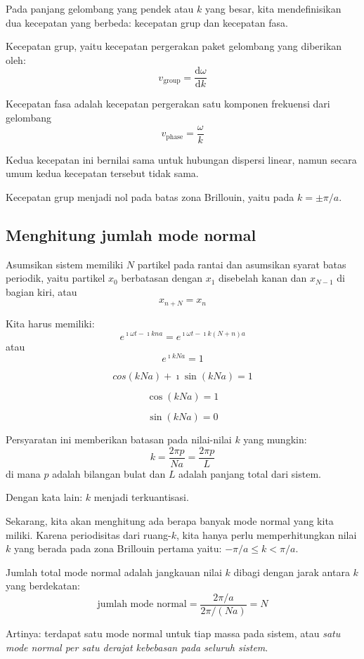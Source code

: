 Pada panjang gelombang yang pendek atau \(k\) yang besar, kita
mendefinisikan dua kecepatan yang berbeda: kecepatan grup dan kecepatan
fasa.

Kecepatan grup, yaitu kecepatan pergerakan paket gelombang yang
diberikan oleh: \[
v_{\mathrm{group}} = \frac{\mathrm{d}\omega}{\mathrm{d}k}
\]

Kecepatan fasa adalah kecepatan pergerakan satu komponen frekuensi dari
gelombang \[
v_{\mathrm{phase}} = \frac{\omega}{k}
\]

Kedua kecepatan ini bernilai sama untuk hubungan dispersi linear, namun
secara umum kedua kecepatan tersebut tidak sama.

Kecepatan grup menjadi nol pada batas zona Brillouin, yaitu pada
\(k = \pm \pi/a\).

\subsection{Menghitung jumlah mode normal}

Asumsikan sistem memiliki \(N\) partikel pada rantai dan asumsikan
syarat batas periodik, yaitu partikel \(x_{0}\) berbatasan dengan
\(x_{1}\) disebelah kanan dan \(x_{N-1}\) di bagian kiri, atau \[
x_{n+N} = x_{n}
\]

Kita harus memiliki: \[
e^{\imath \omega t - \imath k n a} =
e^{\imath \omega t - \imath k (N+n) a}
\] atau \[
e^{\imath k N a} = 1
\]

\[
cos(kNa) + \imath \sin(kNa) = 1
\]

\[
\cos(kNa) = 1
\]

\[
\sin(kNa) = 0
\]

Persyaratan ini memberikan batasan pada nilai-nilai \(k\) yang mungkin:
\[
k = \frac{2\pi p}{Na} = \frac{2\pi p}{L}
\] di mana \(p\) adalah bilangan bulat dan \(L\) adalah panjang total
dari sistem.

Dengan kata lain: \(k\) menjadi terkuantisasi.

Sekarang, kita akan menghitung ada berapa banyak mode normal yang kita
miliki. Karena periodisitas dari ruang-\(k\), kita hanya perlu
memperhitungkan nilai \(k\) yang berada pada zona Brillouin pertama
yaitu: \(-\pi/a \leq k < \pi/a\).

Jumlah total mode normal adalah jangkauan nilai \(k\) dibagi dengan
jarak antara \(k\) yang berdekatan: \[
\text{jumlah mode normal} = \frac{2\pi/a}{2\pi/(Na)} = N
\]

Artinya: terdapat satu mode normal untuk tiap massa pada sistem, atau
\emph{satu mode normal per satu derajat kebebasan pada seluruh sistem}.

